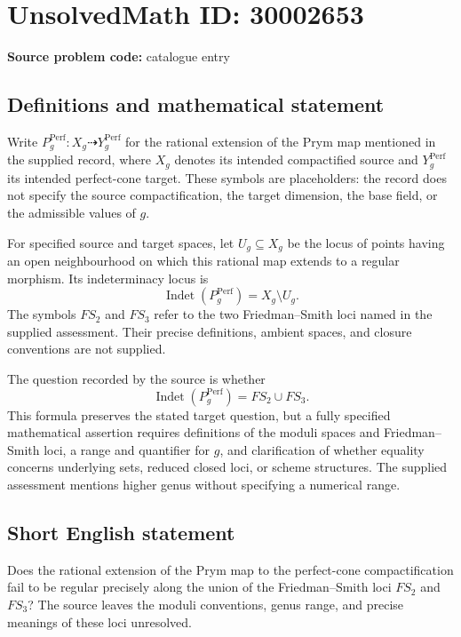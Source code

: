 \documentclass[11pt]{article}
\begin{document}
\section*{UnsolvedMath ID: 30002653}
\textbf{Source problem code:} catalogue entry
\subsection{Definitions and mathematical statement}
Write \(P_g^{\mathrm{Perf}}\colon X_g\dashrightarrow Y_g^{\mathrm{Perf}}\) for the rational extension of the Prym map mentioned in the supplied record, where \(X_g\) denotes its intended compactified source and \(Y_g^{\mathrm{Perf}}\) its intended perfect-cone target. These symbols are placeholders: the record does not specify the source compactification, the target dimension, the base field, or the admissible values of \(g\).

For specified source and target spaces, let \(U_g\subseteq X_g\) be the locus of points having an open neighbourhood on which this rational map extends to a regular morphism. Its indeterminacy locus is
\[
\operatorname{Indet}(P_g^{\mathrm{Perf}})=X_g\setminus U_g.
\]
The symbols \(FS_2\) and \(FS_3\) refer to the two Friedman--Smith loci named in the supplied assessment. Their precise definitions, ambient spaces, and closure conventions are not supplied.

The question recorded by the source is whether
\[
\operatorname{Indet}(P_g^{\mathrm{Perf}})=FS_2\cup FS_3.
\]
This formula preserves the stated target question, but a fully specified mathematical assertion requires definitions of the moduli spaces and Friedman--Smith loci, a range and quantifier for \(g\), and clarification of whether equality concerns underlying sets, reduced closed loci, or scheme structures. The supplied assessment mentions higher genus without specifying a numerical range.
\subsection{Short English statement}
Does the rational extension of the Prym map to the perfect-cone compactification fail to be regular precisely along the union of the Friedman--Smith loci \(FS_2\) and \(FS_3\)? The source leaves the moduli conventions, genus range, and precise meanings of these loci unresolved.
\end{document}
